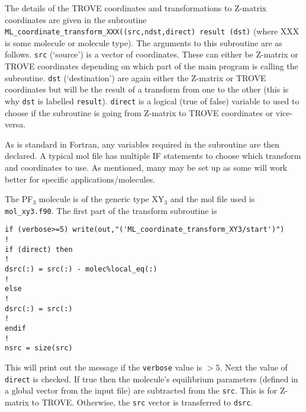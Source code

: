 The details of the TROVE coordinates and transformations to Z-matrix coordinates are given in the 
subroutine \verb|ML_coordinate_transform_XXX((src,ndst,direct) result (dst)| (where XXX is some molecule or molecule type). 
The arguments to this subroutine are as follows.
\verb|src| (`source') is a vector of coordinates. These can either be Z-matrix or TROVE coordinates depending on 
which part of the main program is calling the subroutine. \verb|dst| (`destination') are again either the Z-matrix or 
TROVE coordinates but will be the result of a transform from one to the other (this is why \verb|dst| is
labelled \verb|result|). \verb|direct| is a logical (true of false) variable to used to choose if the subroutine is 
going from Z-matrix to TROVE coordinates or vice-versa.

As is standard in Fortran, any variables required in the subroutine are then declared. A typical mol file has 
multiple IF statements to choose which transform and coordinates to use. As mentioned, many may be set up as 
some will work better for specific applications/molecules. 

The PF$_3$ molecule is of the generic type XY$_3$ and the mol file used is  \verb|mol_xy3.f90|. The first part of the
transform subroutine is 
\begin{verbatim}
if (verbose>=5) write(out,"('ML_coordinate_transform_XY3/start')")
!
if (direct) then
!
dsrc(:) = src(:) - molec%local_eq(:)
!
else
!
dsrc(:) = src(:)
!
endif
!
nsrc = size(src)
\end{verbatim}
This will print out the message if the \verb|verbose| value is $>5$. Next the value of \verb|direct| is checked. If true
then the molecule's equilibrium parameters (defined in a global vector from the input file) are subtracted from the
\verb|src|. This is for Z-matrix to TROVE. Otherwise, the \verb|src| vector is transferred to \verb|dsrc|. 

